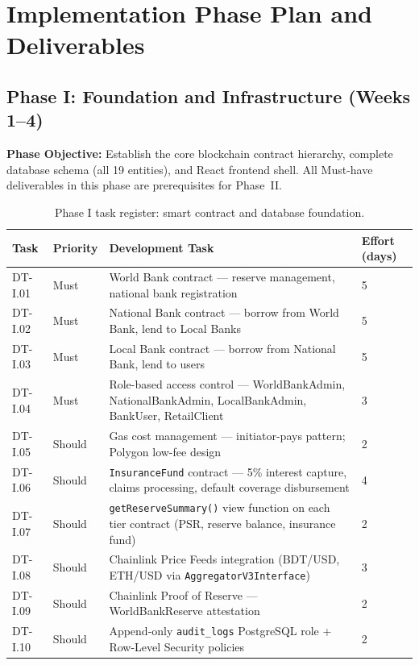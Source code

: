 \documentclass[12pt,a4paper]{report}
\begin{document}
\section{Implementation Phase Plan and Deliverables}

\subsection{Phase I: Foundation and Infrastructure (Weeks 1--4)}

\textbf{Phase Objective:} Establish the core blockchain contract hierarchy,
complete database schema (all 19 entities), and React frontend shell.
All Must-have deliverables in this phase are prerequisites for Phase~II.

\begin{table}[H]
\centering
\caption[Phase I task register: smart contract and database foundation]{Phase I task register: smart contract and database foundation.%
\footnotemark}
\label{tab:phaseI-contracts}
\small
\begin{tabular}{p{1.8cm}p{1.8cm}p{7.5cm}p{1.5cm}}
\hline
\textbf{Task} & \textbf{Priority} & \textbf{Development Task} & \textbf{Effort (days)} \\
\hline
DT-I.01 & Must & World Bank contract --- reserve management, national bank registration & 5 \\
DT-I.02 & Must & National Bank contract --- borrow from World Bank, lend to Local Banks & 5 \\
DT-I.03 & Must & Local Bank contract --- borrow from National Bank, lend to users & 5 \\
DT-I.04 & Must & Role-based access control --- WorldBankAdmin, NationalBankAdmin, LocalBankAdmin, BankUser, RetailClient & 3 \\
DT-I.05 & Should & Gas cost management --- initiator-pays pattern; Polygon low-fee design & 2 \\
DT-I.06 & Should & \texttt{InsuranceFund} contract --- 5\% interest capture, claims processing, default coverage disbursement & 4 \\
DT-I.07 & Should & \texttt{getReserveSummary()} view function on each tier contract (PSR, reserve balance, insurance fund) & 2 \\
DT-I.08 & Should & Chainlink Price Feeds integration (BDT/USD, ETH/USD via \texttt{AggregatorV3Interface}) & 3 \\
DT-I.09 & Should & Chainlink Proof of Reserve --- WorldBankReserve attestation & 2 \\
DT-I.10 & Should & Append-only \texttt{audit\_logs} PostgreSQL role + Row-Level Security policies & 2 \\

\end{tabular}
\end{table}
\end{document}
